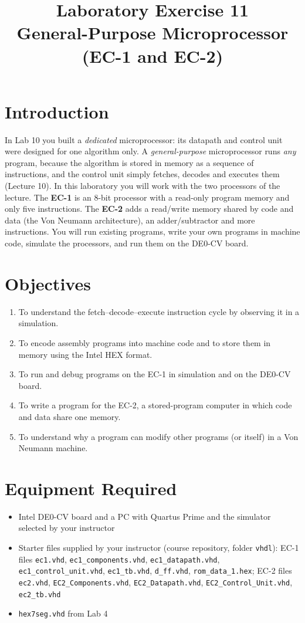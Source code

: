 \documentclass{article}
\title{Laboratory Exercise 11 \\ General-Purpose Microprocessor (EC-1 and EC-2)}
\author{}
\date{}
\begin{document}
\maketitle

\section*{Introduction}
In Lab 10 you built a \emph{dedicated} microprocessor: its datapath and control unit were designed for one algorithm only. A \emph{general-purpose} microprocessor runs \emph{any} program, because the algorithm is stored in memory as a sequence of instructions, and the control unit simply fetches, decodes and executes them (Lecture 10). In this laboratory you will work with the two processors of the lecture. The \textbf{EC-1} is an 8-bit processor with a read-only program memory and only five instructions. The \textbf{EC-2} adds a read/write memory shared by code and data (the Von Neumann architecture), an adder/subtractor and more instructions. You will run existing programs, write your own programs in machine code, simulate the processors, and run them on the DE0-CV board.

\section*{Objectives}
\begin{enumerate}
    \item To understand the fetch--decode--execute instruction cycle by observing it in a simulation.
    \item To encode assembly programs into machine code and to store them in memory using the Intel HEX format.
    \item To run and debug programs on the EC-1 in simulation and on the DE0-CV board.
    \item To write a program for the EC-2, a stored-program computer in which code and data share one memory.
    \item To understand why a program can modify other programs (or itself) in a Von Neumann machine.
\end{enumerate}

\section*{Equipment Required}
\begin{itemize}
    \item Intel DE0-CV board and a PC with Quartus Prime and the simulator selected by your instructor
    \item Starter files supplied by your instructor (course repository, folder \texttt{vhdl}): EC-1 files \texttt{ec1.vhd}, \texttt{ec1\_components.vhd}, \texttt{ec1\_datapath.vhd}, \texttt{ec1\_control\_unit.vhd}, \texttt{ec1\_tb.vhd}, \texttt{d\_ff.vhd}, \texttt{rom\_data\_1.hex}; EC-2 files \texttt{ec2.vhd}, \texttt{EC2\_Components.vhd}, \texttt{EC2\_Datapath.vhd}, \texttt{EC2\_Control\_Unit.vhd}, \texttt{ec2\_tb.vhd}
    \item \texttt{hex7seg.vhd} from Lab 4
\end{itemize}
\end{document}
